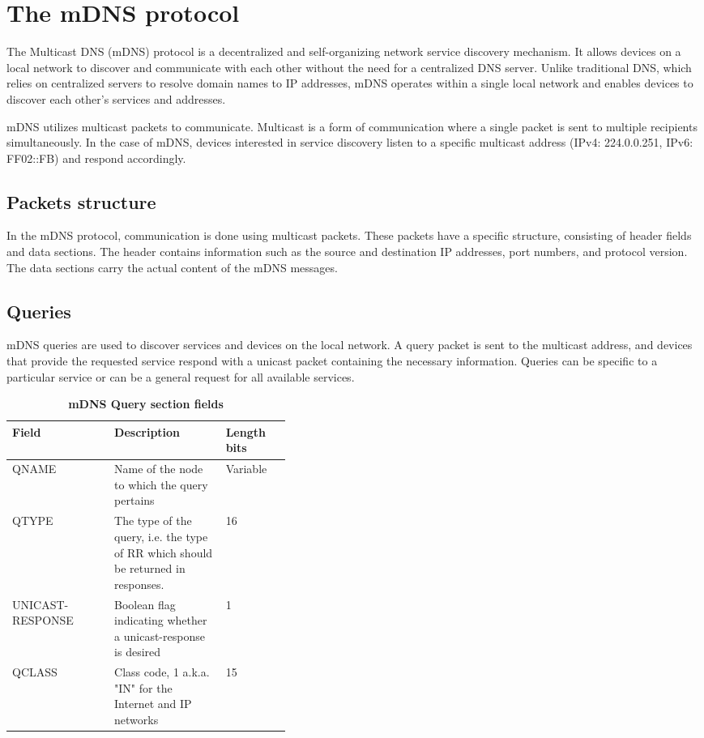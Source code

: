 \section{The mDNS protocol}
The Multicast DNS (mDNS) protocol is a decentralized and self-organizing network service discovery mechanism. It allows devices on a local network to discover and communicate with each other without the need for a centralized DNS server. Unlike traditional DNS, which relies on centralized servers to resolve domain names to IP addresses, mDNS operates within a single local network and enables devices to discover each other's services and addresses.

mDNS utilizes multicast packets to communicate. Multicast is a form of communication where a single packet is sent to multiple recipients simultaneously. In the case of mDNS, devices interested in service discovery listen to a specific multicast address (IPv4: 224.0.0.251, IPv6: FF02::FB) and respond accordingly.

\subsection{Packets structure}
In the mDNS protocol, communication is done using multicast packets. These packets have a specific structure, consisting of header fields and data sections. The header contains information such as the source and destination IP addresses, port numbers, and protocol version. The data sections carry the actual content of the mDNS messages.
\subsection{Queries}
mDNS queries are used to discover services and devices on the local network. A query packet is sent to the multicast address, and devices that provide the requested service respond with a unicast packet containing the necessary information. Queries can be specific to a particular service or can be a general request for all available services.

\begin{table}[H]
    \centering
    \caption{\textbf{mDNS Query section fields}}
    \begin{tabularx}{\linewidth}{|X|p{0.4\linewidth}|X|}
    \hline
    \textbf{Field} & \textbf{Description} & \textbf{Length bits}\\ \hline
    QNAME & Name of the node to which the query pertains & Variable   \\ \hline
    QTYPE & The type of the query, i.e. the type of RR which should be returned in responses. & 16\\ \hline
    UNICAST-RESPONSE & Boolean flag indicating whether a unicast-response is desired & 1\\ \hline
    QCLASS & Class code, 1 a.k.a. "IN" for the Internet and IP networks & 15\\ \hline
    \end{tabularx}
    \label{tab:query}
\end{table}


